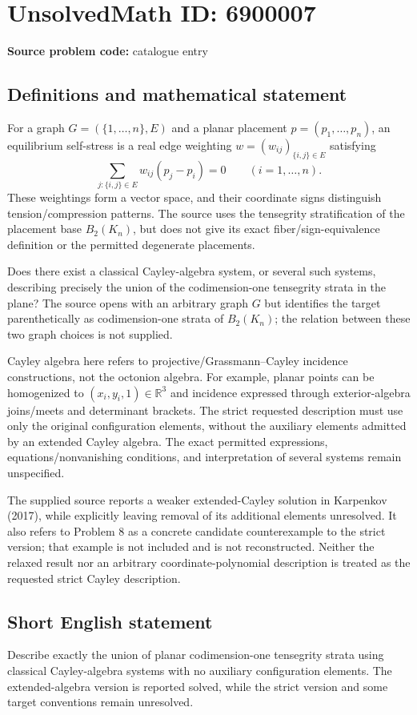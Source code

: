 \documentclass[11pt]{article}
\begin{document}
\section*{UnsolvedMath ID: 6900007}
\textbf{Source problem code:} catalogue entry
\subsection{Definitions and mathematical statement}
For a graph $G=(\{1,\ldots,n\},E)$ and a planar placement $p=(p_1,\ldots,p_n)$, an equilibrium self-stress is a real edge weighting $w=(w_{ij})_{\{i,j\}\in E}$ satisfying
\[
\sum_{j:\{i,j\}\in E}w_{ij}(p_j-p_i)=0\qquad(i=1,\ldots,n).
\]
These weightings form a vector space, and their coordinate signs distinguish tension/compression patterns. The source uses the tensegrity stratification of the placement base $B_2(K_n)$, but does not give its exact fiber/sign-equivalence definition or the permitted degenerate placements.

Does there exist a classical Cayley-algebra system, or several such systems, describing precisely the union of the codimension-one tensegrity strata in the plane? The source opens with an arbitrary graph $G$ but identifies the target parenthetically as codimension-one strata of $B_2(K_n)$; the relation between these two graph choices is not supplied.

Cayley algebra here refers to projective/Grassmann--Cayley incidence constructions, not the octonion algebra. For example, planar points can be homogenized to $(x_i,y_i,1)\in\mathbb R^3$ and incidence expressed through exterior-algebra joins/meets and determinant brackets. The strict requested description must use only the original configuration elements, without the auxiliary elements admitted by an extended Cayley algebra. The exact permitted expressions, equations/nonvanishing conditions, and interpretation of several systems remain unspecified.

The supplied source reports a weaker extended-Cayley solution in Karpenkov (2017), while explicitly leaving removal of its additional elements unresolved. It also refers to Problem 8 as a concrete candidate counterexample to the strict version; that example is not included and is not reconstructed. Neither the relaxed result nor an arbitrary coordinate-polynomial description is treated as the requested strict Cayley description.
\subsection{Short English statement}
Describe exactly the union of planar codimension-one tensegrity strata using classical Cayley-algebra systems with no auxiliary configuration elements. The extended-algebra version is reported solved, while the strict version and some target conventions remain unresolved.
\end{document}
